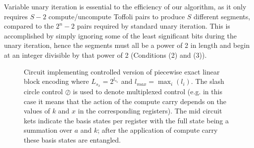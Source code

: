 Variable unary iteration is essential to the efficiency of our algorithm, as it only requires $S-2$ compute/uncompute Toffoli pairs to produce $S$ different segments, compared to the $2^n-2$ pairs required by standard unary iteration. This is accomplished by simply ignoring some of the least significant bits during the unary iteration, hence the segments must all be a power of 2 in length and begin at an integer divisible by that power of 2 (Conditions (2) and (3)).


\begin{figure}
\centering
{}
\caption{\label{fig:be_circuit}Circuit implementing controlled version of piecewise exact linear block encoding where $L_{s_x} = 2^{l_{s_x}}$ and $l_{max} = \max_i(l_i)$. The slash circle control $\oslash$ is used to denote multiplexed control \cite{lowTradingTgatesDirty2018} (e.g. in this case it means that the action of the compute carry depends on the values of $k$ and $x$ in the corresponding registers). The mid circuit kets indicate the basis states per register with the full state being a summation over $a$ and $k$; after the application of compute carry these basis states are entangled.}
\end{figure}


